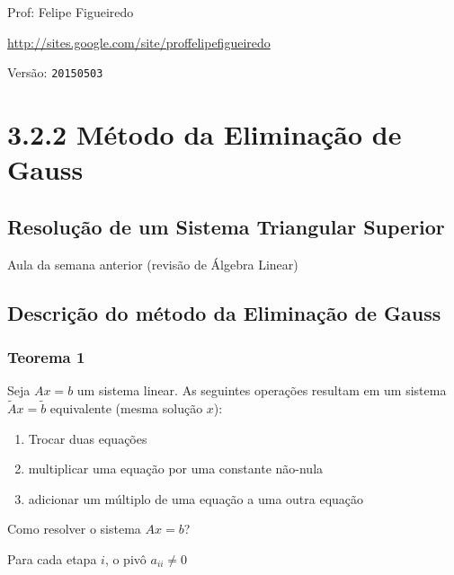 \documentclass[a4paper]{article}
\begin{document}
\parbox[c]{.825\textwidth}{\raggedright%
{Prof: Felipe Figueiredo\par}
{\url{http://sites.google.com/site/proffelipefigueiredo}\par}
}

Versão: \verb|20150503|





\section*{3.2.2 Método da Eliminação de Gauss}

\subsection*{Resolução de um Sistema Triangular Superior}

Aula da semana anterior (revisão de Álgebra Linear)

\subsection*{Descrição do método da Eliminação de Gauss}

\subsubsection*{Teorema 1}

Seja $Ax=b$ um sistema linear. As seguintes operações resultam em um
sistema $\tilde{A}x=\tilde{b}$ equivalente (mesma solução $x$):

\begin{enumerate}
\item Trocar duas equações
\item multiplicar uma equação por uma constante não-nula
\item adicionar um múltiplo de uma equação a uma outra equação
\end{enumerate}

Como resolver o sistema $Ax=b$?

Para cada etapa $i$, o pivô $a_{ii} \ne 0$
\end{document}
